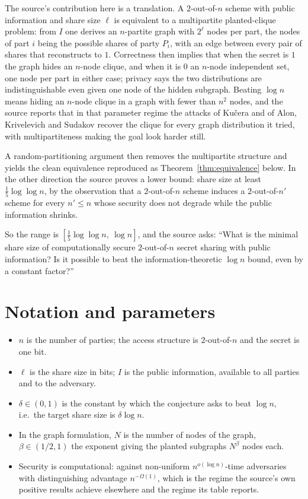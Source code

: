 \documentclass{aicr-conjecture}
\newcommand{\Om}{\Omega}
\begin{document}
The source's contribution here is a translation. A $2$-out-of-$n$ scheme
with public information and share size $\ell$ is equivalent to a
multipartite planted-clique problem: from $I$ one derives an $n$-partite
graph with $2^{\ell}$ nodes per part, the nodes of part $i$ being the
possible shares of party $P_{i}$, with an edge between every pair of
shares that reconstructs to $1$. Correctness then implies that when the
secret is $1$ the graph hides an $n$-node clique, and when it is $0$ an
$n$-node independent set, one node per part in either case; privacy says
the two distributions are indistinguishable even given one node of the
hidden subgraph. Beating $\log n$ means hiding an $n$-node clique in a
graph with fewer than $n^{2}$ nodes, and the source reports that in that
parameter regime the attacks of Ku\v{c}era and of Alon, Krivelevich and
Sudakov recover the clique for every graph distribution it tried, with
multipartiteness making the goal look harder still.

A random-partitioning argument then removes the multipartite structure
and yields the clean equivalence reproduced as
Theorem~\ref{thm:equivalence} below. In the other direction the source
proves a lower bound: share size at least $\frac{1}{5}\log\log n$, by the
observation that a $2$-out-of-$n$ scheme induces a $2$-out-of-$n'$ scheme
for every $n' \le n$ whose security does not degrade while the public
information shrinks.

So the range is $[\frac{1}{5}\log\log n,\ \log n]$, and the source asks:
``What is the minimal share size of computationally secure
$2$-out-of-$n$ secret sharing with public information? Is it possible to
beat the information-theoretic $\log n$ bound, even by a constant
factor?''

\section{Notation and parameters}\label{sec:notation}

\begin{itemize}[nosep]
  \item $n$ is the number of parties; the access structure is
    $2$-out-of-$n$ and the secret is one bit.
  \item $\ell$ is the share size in bits; $I$ is the public
    information, available to all parties and to the adversary.
  \item $\delta \in (0,1)$ is the constant by which the conjecture asks
    to beat $\log n$, i.e.\ the target share size is $\delta \log n$.
  \item In the graph formulation, $N$ is the number of nodes of the
    graph, $\beta \in (1/2, 1)$ the exponent giving the planted
    subgraphs $N^{\beta}$ nodes each.
  \item Security is computational: against non-uniform
    $n^{o(\log n)}$-time adversaries with distinguishing advantage
    $n^{-\Om(1)}$, which is the regime the source's own positive results
    achieve elsewhere and the regime its table reports.
\end{itemize}
\end{document}
